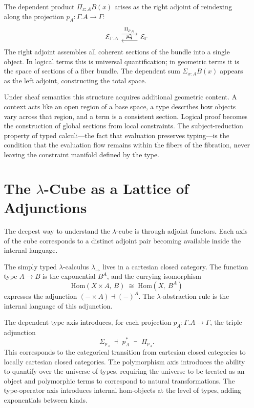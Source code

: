 \documentclass[12pt,a4paper]{article}
\theoremstyle{plain}
\theoremstyle{definition}
\newcommand{\E}{\mathcal{E}}
\newcommand{\Hom}{\mathrm{Hom}}
\begin{document}
The dependent product $\Pi_{x:A} B(x)$ arises as the right adjoint of
reindexing along the projection $p_A : \Gamma.A \to \Gamma$:
\[
\begin{tikzcd}
\E_{\Gamma.A} \arrow[r, shift left=2, "\Pi_{p_A}"] &
\E_\Gamma \arrow[l, shift left=2, "p_A^*"'] \arrow[l, phantom, "\dashv"]
\end{tikzcd}
\]
The right adjoint assembles all coherent sections of the bundle into a single
object. In logical terms this is universal quantification; in geometric terms it
is the space of sections of a fiber bundle. The dependent sum $\Sigma_{x:A}
B(x)$ appears as the left adjoint, constructing the total space.

Under sheaf semantics this structure acquires additional geometric content. A
context acts like an open region of a base space, a type describes how objects
vary across that region, and a term is a consistent section. Logical proof
becomes the construction of global sections from local constraints. The
subject-reduction property of typed calculi---the fact that evaluation preserves
typing---is the condition that the evaluation flow remains within the fibers of
the fibration, never leaving the constraint manifold defined by the type.

\section{The $\lambda$-Cube as a Lattice of Adjunctions}
\label{sec:adjunctions}

The deepest way to understand the $\lambda$-cube is through adjoint functors.
Each axis of the cube corresponds to a distinct adjoint pair becoming available
inside the internal language.

The simply typed $\lambda$-calculus $\lambda_\to$ lives in a cartesian closed
category. The function type $A \to B$ is the exponential $B^A$, and the currying
isomorphism
\[
\Hom(X \times A,\, B) \;\cong\; \Hom(X,\, B^A)
\]
expresses the adjunction $(- \times A) \dashv (-)^A$. The $\lambda$-abstraction
rule is the internal language of this adjunction.

The dependent-type axis introduces, for each projection $p_A : \Gamma.A \to
\Gamma$, the triple adjunction
\[
\Sigma_{p_A} \;\dashv\; p_A^* \;\dashv\; \Pi_{p_A}.
\]
This corresponds to the categorical transition from cartesian closed categories
to locally cartesian closed categories. The polymorphism axis introduces the
ability to quantify over the universe of types, requiring the universe to be
treated as an object and polymorphic terms to correspond to natural
transformations. The type-operator axis introduces internal hom-objects at the
level of types, adding exponentials between kinds.
\end{document}
